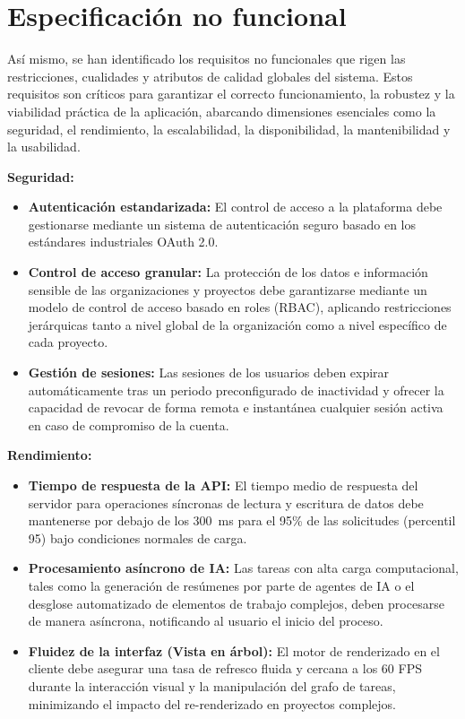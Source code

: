\section{Especificación no funcional}
Así mismo, se han identificado los requisitos no funcionales que rigen las restricciones, cualidades y atributos de calidad globales del sistema. Estos requisitos son críticos para garantizar el correcto funcionamiento, la robustez y la viabilidad práctica de la aplicación, abarcando dimensiones esenciales como la seguridad, el rendimiento, la escalabilidad, la disponibilidad, la mantenibilidad y la usabilidad.

\textbf{Seguridad:} 
\begin{itemize}
    \item \textbf{Autenticación estandarizada:} El control de acceso a la plataforma debe gestionarse mediante un sistema de autenticación seguro basado en los estándares industriales OAuth 2.0\cite{rfc6749}.
    \item \textbf{Control de acceso granular:} La protección de los datos e información sensible de las organizaciones y proyectos debe garantizarse mediante un modelo de control de acceso basado en roles (RBAC), aplicando restricciones jerárquicas tanto a nivel global de la organización como a nivel específico de cada proyecto.
    \item \textbf{Gestión de sesiones:} Las sesiones de los usuarios deben expirar automáticamente tras un periodo preconfigurado de inactividad y ofrecer la capacidad de revocar de forma remota e instantánea cualquier sesión activa en caso de compromiso de la cuenta.
\end{itemize}

\textbf{Rendimiento:}
\begin{itemize}
    \item \textbf{Tiempo de respuesta de la API:} El tiempo medio de respuesta del servidor para operaciones síncronas de lectura y escritura de datos debe mantenerse por debajo de los 300~ms para el 95\% de las solicitudes (percentil 95) bajo condiciones normales de carga.
    \item \textbf{Procesamiento asíncrono de IA:} Las tareas con alta carga computacional, tales como la generación de resúmenes por parte de agentes de \ac{IA} o el desglose automatizado de elementos de trabajo complejos, deben procesarse de manera asíncrona, notificando al usuario el inicio del proceso.
    \item \textbf{Fluidez de la interfaz (Vista en árbol):} El motor de renderizado en el cliente debe asegurar una tasa de refresco fluida y cercana a los 60 \ac{FPS} durante la interacción visual y la manipulación del grafo de tareas, minimizando el impacto del re-renderizado en proyectos complejos.
\end{itemize}

